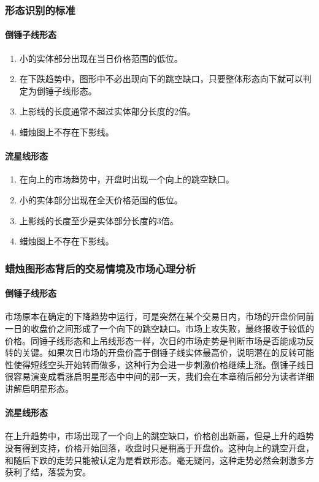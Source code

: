 \subsubsection*{形态识别的标准}
\paragraph{倒锤子线形态}
\begin{enumerate}
    \item 小的实体部分出现在当日价格范围的低位。
    \item 在下跌趋势中，图形中不必出现向下的跳空缺口，只要整体形态向下就可以判定为倒锤子线形态。
    \item 上影线的长度通常不超过实体部分长度的2倍。
    \item 蜡烛图上不存在下影线。
\end{enumerate}
\paragraph{流星线形态}
\begin{enumerate}
    \item 在向上的市场趋势中，开盘时出现一个向上的跳空缺口。
    \item 小的实体部分出现在全天价格范围的低位。
    \item 上影线的长度至少是实体部分长度的3倍。
    \item 蜡烛图上不存在下影线。
\end{enumerate}
\subsubsection*{蜡烛图形态背后的交易情境及市场心理分析}
\paragraph{倒锤子线形态} 市场原本在确定的下降趋势中运行，可是突然在某个交易日内，市场的开盘价同前一日的收盘价之间形成了一个向下的跳空缺口。市场上攻失败，最终报收于较低的价格。同锤子线形态和上吊线形态一样，次日的市场走势是判断市场是否能成功反转的关键。如果次日市场的开盘价高于倒锤子线实体最高价，说明潜在的反转可能性使得短线空头开始转而做多，这种行为会进一步刺激价格继续上涨。倒锤子线日很容易演变成看涨启明星形态中中间的那一天，我们会在本章稍后部分为读者详细讲解启明星形态。
\paragraph{流星线形态} 在上升趋势中，市场出现了一个向上的跳空缺口，价格创出新高，但是上升的趋势没有得到支持，价格开始回落，收盘时只是稍高于开盘价。这种向上的跳空开盘，和随后下跌的走势只能被认定为是看跌形态。毫无疑问，这种走势必然会刺激多方获利了结，落袋为安。

